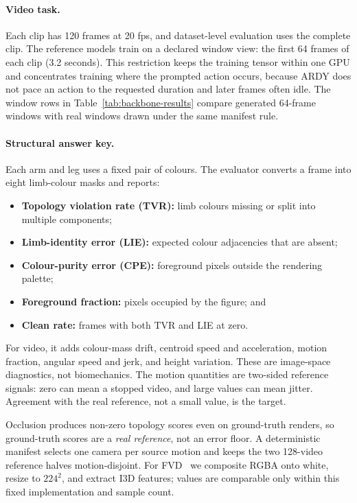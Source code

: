 \documentclass[10pt,twocolumn]{article}
\begin{document}
\paragraph{Video task.} Each clip has 120 frames at 20 fps, and dataset-level evaluation uses the complete
clip. The reference models train on a declared window view: the first 64 frames of each clip (3.2 seconds).
This restriction keeps the training tensor within one GPU and concentrates training where the prompted action
occurs, because ARDY does not pace an action to the requested duration and later frames often idle. The window
rows in Table~\ref{tab:backbone-results} compare generated 64-frame windows with real windows drawn under the
same manifest rule.

\paragraph{Structural answer key.} Each arm and leg uses a fixed pair of colours. The evaluator converts a
frame into eight limb-colour masks and reports:
\begin{itemize}\setlength\itemsep{0pt}
    \item \textbf{Topology violation rate (TVR):} limb colours missing or split into multiple components;
    \item \textbf{Limb-identity error (LIE):} expected colour adjacencies that are absent;
    \item \textbf{Colour-purity error (CPE):} foreground pixels outside the rendering palette;
    \item \textbf{Foreground fraction:} pixels occupied by the figure; and
    \item \textbf{Clean rate:} frames with both TVR and LIE at zero.
\end{itemize}
For video, it adds colour-mass drift, centroid speed and acceleration, motion fraction, angular speed and
jerk, and height variation. These are image-space diagnostics, not biomechanics. The motion quantities are
two-sided reference signals: zero can mean a stopped video, and large values can mean jitter. Agreement with
the real reference, not a small value, is the target.

Occlusion produces non-zero topology scores even on ground-truth renders, so ground-truth scores are a
\emph{real reference}, not an error floor. A deterministic manifest selects one camera per source motion and
keeps the two 128-video reference halves motion-disjoint. For FVD~\cite{unterthiner2018fvd} we composite RGBA
onto white, resize to $224^2$, and extract I3D features; values are comparable only within this fixed
implementation and sample count.
\end{document}
